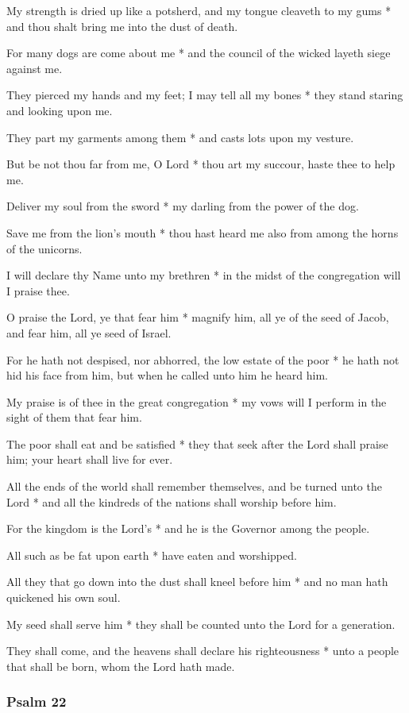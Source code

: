 My strength is dried up like a potsherd, and my tongue cleaveth to my gums * and thou shalt bring me into the dust of death.

For many dogs are come about me * and the council of the wicked layeth siege against me.

They pierced my hands and my feet; I may tell all my bones * they stand staring and looking upon me.

They part my garments among them * and casts lots upon my vesture.

But be not thou far from me, O Lord * thou art my succour, haste thee to help me.

Deliver my soul from the sword * my darling from the power of the dog.

Save me from the lion's mouth * thou hast heard me also from among the horns of the unicorns.

I will declare thy Name unto my brethren * in the midst of the congregation will I praise thee.

O praise the Lord, ye that fear him * magnify him, all ye of the seed of Jacob, and fear him, all ye seed of Israel.

For he hath not despised, nor abhorred, the low estate of the poor * he hath not hid his face from him, but when he called unto him he heard him.

My praise is of thee in the great congregation * my vows will I perform in the sight of them that fear him.

The poor shall eat and be satisfied * they that seek after the Lord shall praise him; your heart shall live for ever.

All the ends of the world shall remember themselves, and be turned unto the Lord * and all the kindreds of the nations shall worship before him.

For the kingdom is the Lord's * and he is the Governor among the people.

All such as be fat upon earth * have eaten and worshipped.

All they that go down into the dust shall kneel before him * and no man hath quickened his own soul.

My seed shall serve him * they shall be counted unto the Lord for a generation.

They shall come, and the heavens shall declare his righteousness * unto a people that shall be born, whom the Lord hath made.

\subsubsection{Psalm 22}

